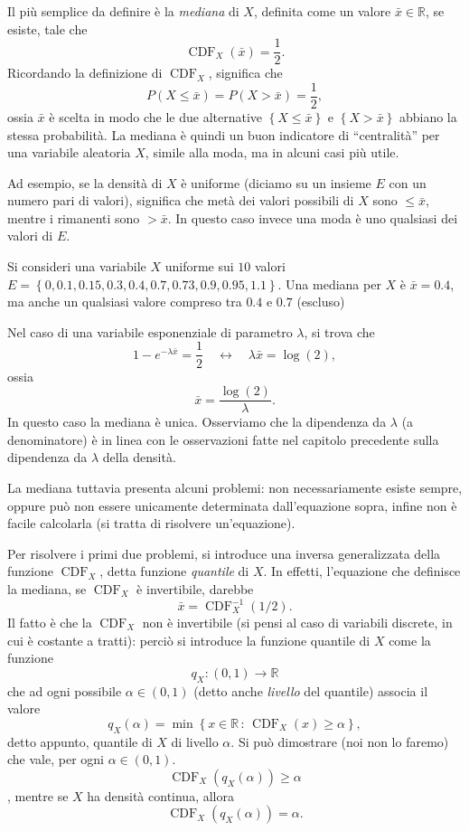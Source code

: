 \documentclass[
  italian,
  letterpaper,
]{book}
\newcommand{\cur}[1]{\left\{ #1 \right\}}
\newcommand{\R}{\mathbb{R}}
\newcommand{\CDF}{\operatorname{CDF}}
\theoremstyle{definition}
\theoremstyle{remark}
\begin{document}
Il più semplice da definire è la \emph{mediana} di \(X\), definita come
un valore \(\bar{x} \in \R\), se esiste, tale che
\[ \CDF_X(\bar{x}) = \frac 1 2.\] Ricordando la definizione di
\(\CDF_X\), significa che
\[ P(X\le \bar{x}) = P(X> \bar{x}) =\frac 1 2,\] ossia \(\bar{x}\) è
scelta in modo che le due alternative \(\cur{X \le \bar{x}}\) e
\(\cur{X > \bar{x}}\) abbiano la stessa probabilità. La mediana è quindi
un buon indicatore di ``centralità'' per una variabile aleatoria \(X\),
simile alla moda, ma in alcuni casi più utile.

Ad esempio, se la densità di \(X\) è uniforme (diciamo su un insieme
\(E\) con un numero pari di valori), significa che metà dei valori
possibili di \(X\) sono \(\le \bar{x}\), mentre i rimanenti sono
\(>\bar{x}\). In questo caso invece una moda è uno qualsiasi dei valori
di \(E\).

Si consideri una variabile \(X\) uniforme sui \(10\) valori
\(E = \cur{0, 0.1, 0.15, 0.3, 0.4, 0.7, 0.73, 0.9, 0.95, 1.1}\). Una
mediana per \(X\) è \(\bar{x}=0.4\), ma anche un qualsiasi valore
compreso tra \(0.4\) e \(0.7\) (escluso)

Nel caso di una variabile esponenziale di parametro \(\lambda\), si
trova che
\[ 1- e^{-\lambda \bar{x}} = \frac 1 2\quad  \leftrightarrow \quad \lambda \bar{x} = \log(2),\]
ossia \[\bar{x} = \frac{\log(2)}{\lambda}.\] In questo caso la mediana è
unica. Osserviamo che la dipendenza da \(\lambda\) (a denominatore) è in
linea con le osservazioni fatte nel capitolo precedente sulla dipendenza
da \(\lambda\) della densità.

La mediana tuttavia presenta alcuni problemi: non necessariamente esiste
sempre, oppure può non essere unicamente determinata dall'equazione
sopra, infine non è facile calcolarla (si tratta di risolvere
un'equazione).

Per risolvere i primi due problemi, si introduce una inversa
generalizzata della funzione \(\CDF_X\), detta funzione \emph{quantile}
di \(X\). In effetti, l'equazione che definisce la mediana, se
\(\CDF_X\) è invertibile, darebbe \[ \bar{x} = \CDF_X^{-1}(1/2).\] Il
fatto è che la \(\CDF_X\) non è invertibile (si pensi al caso di
variabili discrete, in cui è costante a tratti): perciò si introduce la
funzione quantile di \(X\) come la funzione \[ q_X : (0,1) \to \R\] che
ad ogni possibile \(\alpha \in (0,1)\) (detto anche \emph{livello} del
quantile) associa il valore
\[ q_X(\alpha) = \min\cur{ x \in \R \, : \, \CDF_X(x) \ge \alpha},\]
detto appunto, quantile di \(X\) di livello \(\alpha\). Si può
dimostrare (noi non lo faremo) che vale, per ogni \(\alpha \in (0,1)\).
\[ \CDF_X( q_X(\alpha)) \ge \alpha\], mentre se \(X\) ha densità
continua, allora \[ \CDF_X( q_X(\alpha)) = \alpha.\]
\end{document}
